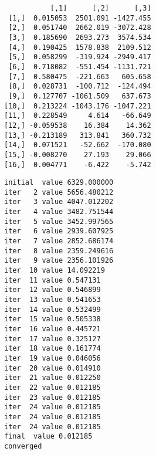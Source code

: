 \documentclass[10pt,]{article}
\newenvironment{Shaded}{\begin{snugshade}}{\end{snugshade}}
\newcommand{\KeywordTok}[1]{\textcolor[rgb]{0.13,0.29,0.53}{\textbf{{#1}}}}
\newcommand{\DataTypeTok}[1]{\textcolor[rgb]{0.13,0.29,0.53}{{#1}}}
\newcommand{\DecValTok}[1]{\textcolor[rgb]{0.00,0.00,0.81}{{#1}}}
\newcommand{\StringTok}[1]{\textcolor[rgb]{0.31,0.60,0.02}{{#1}}}
\newcommand{\NormalTok}[1]{{#1}}
\begin{document}
\begin{verbatim}
           [,1]      [,2]      [,3]
 [1,]  0.015053  2501.091 -1427.455
 [2,]  0.051740  2662.019 -3072.428
 [3,]  0.185690  2693.273  3574.534
 [4,]  0.190425  1578.838  2109.512
 [5,]  0.058299  -319.924 -2949.417
 [6,]  0.718082  -551.454 -1131.721
 [7,]  0.580475  -221.663   605.658
 [8,]  0.028731  -100.712  -124.494
 [9,]  0.127707 -1061.509   637.673
[10,]  0.213224 -1043.176 -1047.221
[11,]  0.228549     4.614   -66.649
[12,] -0.059538    16.384    14.362
[13,] -0.213189   313.841   360.732
[14,]  0.071521   -52.662  -170.080
[15,] -0.008270    27.193    29.066
[16,]  0.004771    -6.422    -5.742
\end{verbatim}

\begin{Shaded}
\end{Shaded}

\begin{verbatim}
initial  value 6329.000000 
iter   2 value 5656.480212
iter   3 value 4047.012202
iter   4 value 3482.751544
iter   5 value 3452.997565
iter   6 value 2939.607925
iter   7 value 2852.686174
iter   8 value 2359.249616
iter   9 value 2356.101926
iter  10 value 14.092219
iter  11 value 0.547131
iter  12 value 0.546899
iter  13 value 0.541653
iter  14 value 0.532499
iter  15 value 0.505338
iter  16 value 0.445721
iter  17 value 0.325127
iter  18 value 0.161774
iter  19 value 0.046056
iter  20 value 0.014910
iter  21 value 0.012250
iter  22 value 0.012185
iter  23 value 0.012185
iter  24 value 0.012185
iter  24 value 0.012185
iter  24 value 0.012185
final  value 0.012185 
converged
\end{verbatim}
\end{document}
